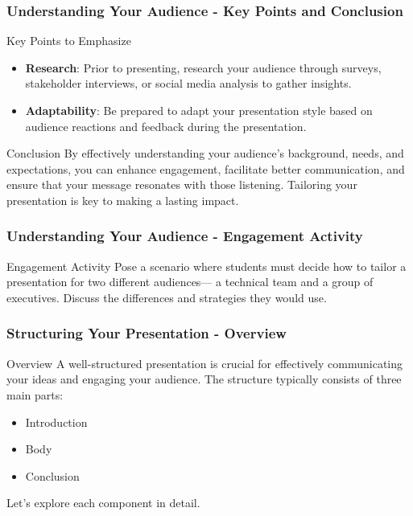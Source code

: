 \documentclass[aspectratio=169]{beamer}
\begin{document}
\begin{frame}[fragile]
    \frametitle{Understanding Your Audience - Key Points and Conclusion}
    \begin{block}{Key Points to Emphasize}
        \begin{itemize}
            \item \textbf{Research}: Prior to presenting, research your audience through surveys, stakeholder interviews, or social media analysis to gather insights.
            \item \textbf{Adaptability}: Be prepared to adapt your presentation style based on audience reactions and feedback during the presentation.
        \end{itemize}
    \end{block}

    \begin{block}{Conclusion}
        By effectively understanding your audience's background, needs, and expectations, you can enhance engagement, facilitate better communication, and ensure that your message resonates with those listening. Tailoring your presentation is key to making a lasting impact.
    \end{block}
\end{frame}

\begin{frame}[fragile]
    \frametitle{Understanding Your Audience - Engagement Activity}
    \begin{block}{Engagement Activity}
        Pose a scenario where students must decide how to tailor a presentation for two different audiences— a technical team and a group of executives. Discuss the differences and strategies they would use.
    \end{block}
\end{frame}

\begin{frame}[fragile]
    \frametitle{Structuring Your Presentation - Overview}
    \begin{block}{Overview}
        A well-structured presentation is crucial for effectively communicating your ideas and engaging your audience. The structure typically consists of three main parts: 
        \begin{itemize}
            \item Introduction
            \item Body
            \item Conclusion
        \end{itemize}
        Let's explore each component in detail.
    \end{block}
\end{frame}
\end{document}
